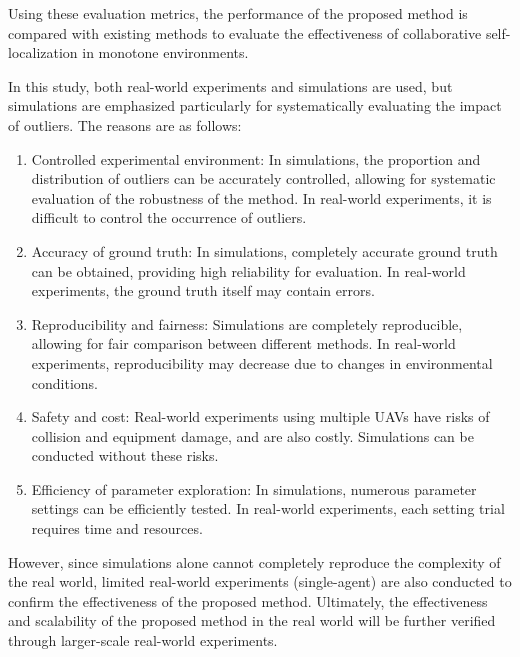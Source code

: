 \documentclass[a4paper,fleqn,10pt,twocolumn]{SICE_ISCS}
\begin{document}
Using these evaluation metrics, the performance of the proposed method is compared with existing methods to evaluate the effectiveness of collaborative self-localization in monotone environments.

In this study, both real-world experiments and simulations are used, but simulations are emphasized particularly for systematically evaluating the impact of outliers. The reasons are as follows:

\begin{enumerate}
\item Controlled experimental environment: In simulations, the proportion and distribution of outliers can be accurately controlled, allowing for systematic evaluation of the robustness of the method. In real-world experiments, it is difficult to control the occurrence of outliers.

\item Accuracy of ground truth: In simulations, completely accurate ground truth can be obtained, providing high reliability for evaluation. In real-world experiments, the ground truth itself may contain errors.

\item Reproducibility and fairness: Simulations are completely reproducible, allowing for fair comparison between different methods. In real-world experiments, reproducibility may decrease due to changes in environmental conditions.

\item Safety and cost: Real-world experiments using multiple UAVs have risks of collision and equipment damage, and are also costly. Simulations can be conducted without these risks.

\item Efficiency of parameter exploration: In simulations, numerous parameter settings can be efficiently tested. In real-world experiments, each setting trial requires time and resources.
\end{enumerate}

However, since simulations alone cannot completely reproduce the complexity of the real world, limited real-world experiments (single-agent) are also conducted to confirm the effectiveness of the proposed method. Ultimately, the effectiveness and scalability of the proposed method in the real world will be further verified through larger-scale real-world experiments.
\end{document}
